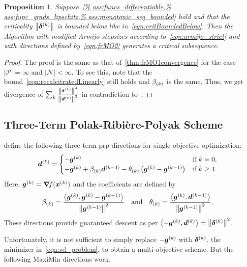 \documentclass{article}
\theoremstyle{plain}
\newtheorem{proposition}[theorem]{Proposition}
\theoremstyle{definition}
\begin{document}
\begin{proposition}
	Suppose~\cref{%
	ass:funcs_differentiable,%
	ass:func_grads_lipschitz,%
	ass:monotonic_seq_bounded}
	hold and that the criticality $\left\|\bm{\delta}^{(k)}\right\|$ is 
	bounded below like in~\eqref{eqn:critBoundedBelow}.
	Then the Algorithm with modified Armijo-stepsizes
	according to~\eqref{eqn:armijo_strict} and with directions defined
	by~\eqref{eqn:frMO2} generates a critical subsequence.
\end{proposition}

\begin{proof}
	The proof is the same as 
	that of~\cref{thm:frMO1convergence} for 
	the case $|\mathcal P|= \infty$ and $|\mathcal N|<\infty$.
	To see this, note that the bound~\eqref{eqn:recalcitratedLinearly}
	still holds and $\beta_{(k)}$ is the same.
	Thus, we get divergence of $\sum_{k} \frac{\left\|\bm{\delta}^{(k)}\right\|^4}{\left\|\bm{d}^{(k)}\right\|^2}$
	in contradiction to~.	
\end{proof}

\subsection{Three-Term Polak-Ribière-Polyak Scheme}
\citet{zhangDescentModifiedPolak2006}
define the following three-term \ac{prp} directions for 
single-objective optimization:
$$
\bm{d}^{(k)} 
= 
\begin{cases}
	-\bm{g}^{(k)}
		&\text{if $k=0$,}
	\\
	-\bm{g}^{(k)}
	+ \beta_{(k)}
	\bm{d}^{(k-1)}
	- \theta_{(k)}
	\left(
		\bm{g}^{(k)} - \bm{g}^{(k-1)}
		\right)
	&\text{if $k\geq1 $.}
\end{cases}
$$
Here, $\bm{g}^{(k)} = \bm{\nabla}\!f(\bm{x}^{(k)})$ and the coefficients are defined by
\begin{equation*}
	\beta_{(k)} = 
	\frac{
		\left\langle \bm{g}^{(k)}, \bm{g}^{(k)}-\bm{g}^{(k-1)} \right\rangle
	}{
		\left\|\bm{g}^{(k-1)}\right\|^2
	}
	\quad\text{and}\quad
	\theta_{(k)}
	=
	\frac{
		\left\langle \bm{g}^{(k)}, \bm{d}^{(k-1)} \right\rangle
	}
	{
		\left\|\bm{g}^{(k-1)}\right\|^2
	}.
\end{equation*}
These directions provide guaranteed descent as per
$\left\langle -\bm{g}^{(k)}, \bm{d}^{(k)} \right\rangle = \left\|\bm{\delta}^{(k)}\right\|^2$.

Unfortunately, it is not sufficient to simply replace
$-\bm{g}^{(k)}$ with $\bm{\delta}^{(k)}$, the minimizer in~\eqref{eqn:sd_problem},
to obtain a multi-objective scheme.
But the following MaxiMin directions work.
\end{document}
